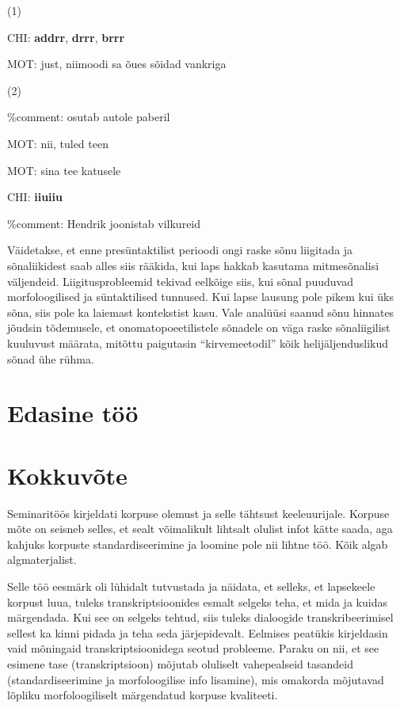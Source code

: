 \documentclass[12pt]{article}
\begin{document}
(1)
\begin{description}
    \item *CHI: \textbf{addrr}, \textbf{drrr}, \textbf{brrr}
    \item *MOT: just, niimoodi sa õues sõidad vankriga \citep[27]{IMITATIIV}
\end{description}

(2)

\%comment: osutab autole paberil
\begin{description}
    \item *MOT: nii, tuled teen
    \item *MOT: sina tee katusele
    \item *CHI: \textbf{iiuiiu}
\end{description}
\%comment: Hendrik joonistab vilkureid \citep[28]{IMITATIIV}

Väidetakse, et enne presüntaktilist perioodi ongi raske sõnu liigitada ja sõnaliikidest saab alles siis rääkida, kui laps hakkab kasutama mitmesõnalisi väljendeid. Liigitusprobleemid tekivad eelkõige siis, kui sõnal puuduvad morfoloogilised ja süntaktilised tunnused. Kui lapse lausung pole pikem kui üks sõna, siis pole ka laiemast kontekstist kasu. \citep[27--29]{IMITATIIV} Vale analüüsi saanud sõnu hinnates jõudsin tõdemusele, et onomatopoeetilistele sõnadele on väga raske sõnaliigilist kuuluvust määrata, mitõttu paigutasin ``kirvemeetodil'' kõik helijäljenduslikud sõnad ühe rühma.



\newpage
\section{Edasine töö}
\newpage

\section*{Kokkuvõte}

Seminaritöös kirjeldati korpuse olemust ja selle tähtsust keeleuurijale. Korpuse mõte on seisneb selles, et sealt võimalikult lihtsalt olulist infot kätte saada, aga kahjuks korpuste standardiseerimine ja loomine pole nii lihtne töö. Kõik algab algmaterjalist. 

Selle töö eesmärk oli lühidalt tutvustada ja näidata, et selleks, et lapsekeele korpust luua, tuleks transkriptsioonides esmalt selgeks teha, et mida ja kuidas märgendada. Kui see on selgeks tehtud, siis tuleks dialoogide transkribeerimisel sellest ka kinni pidada ja teha seda järjepidevalt. Eelmises peatükis kirjeldasin vaid mõningaid transkriptsioonidega seotud probleeme. Paraku on nii, et see esimene tase (transkriptsioon) mõjutab oluliselt vahepealseid tasandeid (standardiseerimine ja morfoloogilise info lisamine), mis omakorda mõjutavad lõpliku morfoloogiliselt märgendatud korpuse kvaliteeti.

\newpage
\cleardoublepage
{}
{}


\end{document}
